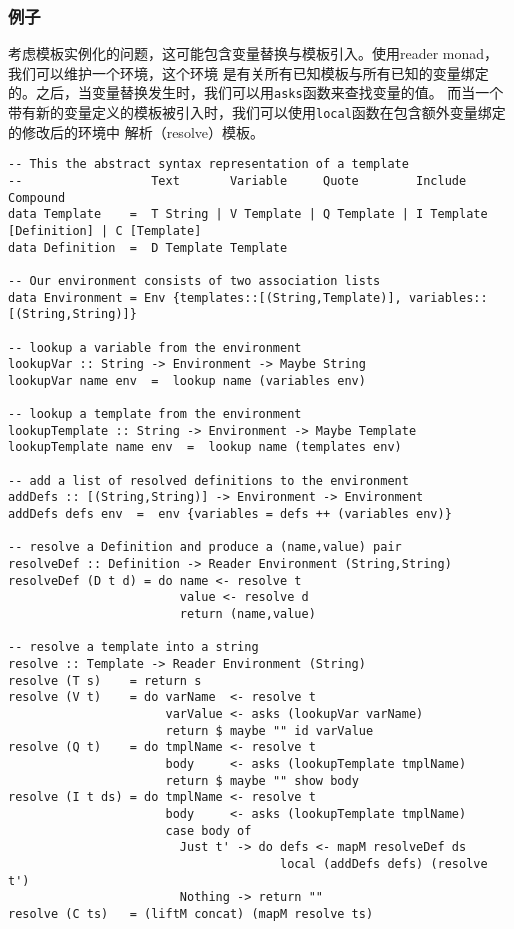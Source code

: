 \subsubsection{例子}
\indent{}考虑模板实例化的问题，这可能包含变量替换与模板引入。使用reader monad，我们可以维护一个环境，这个环境
是有关所有已知模板与所有已知的变量绑定的。之后，当变量替换发生时，我们可以用\texttt{asks}函数来查找变量的值。
而当一个带有新的变量定义的模板被引入时，我们可以使用\texttt{local}函数在包含额外变量绑定的修改后的环境中
解析（resolve）模板。
\vspace{-0.8em}
\begin{verbatim}
-- This the abstract syntax representation of a template
--                  Text       Variable     Quote        Include                   Compound
data Template    =  T String | V Template | Q Template | I Template [Definition] | C [Template]
data Definition  =  D Template Template

-- Our environment consists of two association lists
data Environment = Env {templates::[(String,Template)], variables::[(String,String)]}

-- lookup a variable from the environment
lookupVar :: String -> Environment -> Maybe String
lookupVar name env  =  lookup name (variables env)

-- lookup a template from the environment
lookupTemplate :: String -> Environment -> Maybe Template
lookupTemplate name env  =  lookup name (templates env)

-- add a list of resolved definitions to the environment
addDefs :: [(String,String)] -> Environment -> Environment
addDefs defs env  =  env {variables = defs ++ (variables env)}

-- resolve a Definition and produce a (name,value) pair
resolveDef :: Definition -> Reader Environment (String,String)
resolveDef (D t d) = do name <- resolve t
                        value <- resolve d
                        return (name,value)

-- resolve a template into a string
resolve :: Template -> Reader Environment (String)
resolve (T s)    = return s
resolve (V t)    = do varName  <- resolve t
                      varValue <- asks (lookupVar varName)
                      return $ maybe "" id varValue
resolve (Q t)    = do tmplName <- resolve t
                      body     <- asks (lookupTemplate tmplName)
                      return $ maybe "" show body
resolve (I t ds) = do tmplName <- resolve t
                      body     <- asks (lookupTemplate tmplName)
                      case body of
                        Just t' -> do defs <- mapM resolveDef ds
                                      local (addDefs defs) (resolve t')
                        Nothing -> return ""
resolve (C ts)   = (liftM concat) (mapM resolve ts)
\end{verbatim}
\clearpage

